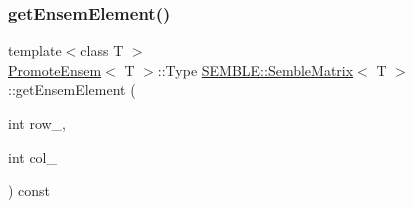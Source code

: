 \subsubsection{\texorpdfstring{getEnsemElement()}{getEnsemElement()}\hspace{0.1cm}{\footnotesize\ttfamily [1/2]}}
{\footnotesize\ttfamily template$<$class T $>$ \\
\mbox{\hyperlink{structSEMBLE_1_1PromoteEnsem}{Promote\+Ensem}}$<$ T $>$\+::Type \mbox{\hyperlink{structSEMBLE_1_1SembleMatrix}{S\+E\+M\+B\+L\+E\+::\+Semble\+Matrix}}$<$ T $>$\+::get\+Ensem\+Element (\begin{DoxyParamCaption}\item[{int}]{row\+\_\+,  }\item[{int}]{col\+\_\+ }\end{DoxyParamCaption}) const}

